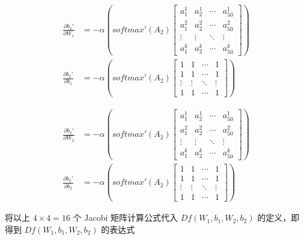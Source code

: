 \documentclass[12pt,a4paper]{amsart}
\begin{document}
\begin{equation}
	\begin{aligned}
		\frac{\partial {b_2}'}{\partial W_1} & = - \alpha \left( softmax'(A_2) \begin{bmatrix}
			a_1^1  & a_2^1  & \cdots & a_{50}^1 \\
			a_1^2  & a_2^2  & \cdots & a_{50}^2 \\
			\vdots & \vdots & \ddots & \vdots   \\
			a_1^k  & a_2^k  & \cdots & a_{50}^k
		\end{bmatrix} \right) \\
		\frac{\partial {b_2}'}{\partial b_1} & = - \alpha \left( softmax'(A_2) \begin{bmatrix}
			1      & 1      & \cdots & 1      \\
			1      & 1      & \cdots & 1      \\
			\vdots & \vdots & \ddots & \vdots \\
			1      & 1      & \cdots & 1
		\end{bmatrix} \right)
	\end{aligned}
\end{equation}

\begin{equation}
	\begin{aligned}
		\frac{\partial {b_2}'}{\partial W_2} & = - \alpha \left( softmax'(A_2) \begin{bmatrix}
			a_1^1  & a_2^1  & \cdots & a_{50}^1 \\
			a_1^2  & a_2^2  & \cdots & a_{50}^2 \\
			\vdots & \vdots & \ddots & \vdots   \\
			a_1^k  & a_2^k  & \cdots & a_{50}^k
		\end{bmatrix} \right) \\
		\frac{\partial {b_2}'}{\partial b_2} & = - \alpha \left( softmax'(A_2) \begin{bmatrix}
			1      & 1      & \cdots & 1      \\
			1      & 1      & \cdots & 1      \\
			\vdots & \vdots & \ddots & \vdots \\
			1      & 1      & \cdots & 1
		\end{bmatrix} \right)
	\end{aligned}
\end{equation}

将以上 $4\times 4 = 16$ 个 Jacobi 矩阵计算公式代入 $Df(W_1, b_1, W_2, b_2)$ 的定义，即得到 $Df(W_1, b_1, W_2, b_2)$ 的表达式
\end{document}
